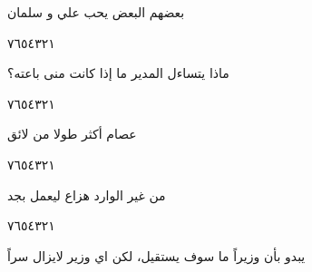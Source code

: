 \documentclass[11pt, a4paper]{article}
\begin{document}
{\vspace{0.5\baselineskip}\begin{flushright}
\textarabic{بعضهم البعض يحب علي و سلمان}
\end{flushright}

\begin{center}
        \hfill\textarabic{٧}\hfill\textarabic{٦}\hfill\textarabic{٥}\hfill\textarabic{٤}\hfill\textarabic{٣}\hfill\textarabic{٢}\hfill\textarabic{١}
        \end{center}


\vspace{0.5\baselineskip}\begin{flushright}
\textarabic{ماذا يتساءل المدير ما إذا كانت منى باعته؟}
\end{flushright}

\begin{center}
        \hfill\textarabic{٧}\hfill\textarabic{٦}\hfill\textarabic{٥}\hfill\textarabic{٤}\hfill\textarabic{٣}\hfill\textarabic{٢}\hfill\textarabic{١}
        \end{center}

\vfill\clearpage

\vspace{0.5\baselineskip}\begin{flushright}
\textarabic{عصام أكثر طولا من لائق}
\end{flushright}

\begin{center}
        \hfill\textarabic{٧}\hfill\textarabic{٦}\hfill\textarabic{٥}\hfill\textarabic{٤}\hfill\textarabic{٣}\hfill\textarabic{٢}\hfill\textarabic{١}
        \end{center}


\vspace{0.5\baselineskip}\begin{flushright}
\textarabic{من غير الوارد هزاع ليعمل بجد}
\end{flushright}

\begin{center}
        \hfill\textarabic{٧}\hfill\textarabic{٦}\hfill\textarabic{٥}\hfill\textarabic{٤}\hfill\textarabic{٣}\hfill\textarabic{٢}\hfill\textarabic{١}
        \end{center}


\vspace{0.5\baselineskip}\begin{flushright}
\textarabic{يبدو بأن وزيراً ما سوف يستقيل، لكن اي وزير لايزال سراً}
\end{flushright}

}
\end{document}
